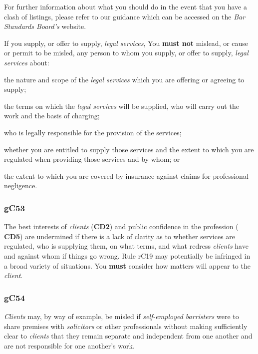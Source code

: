 For further information about what you should do in the event that you
have a clash of listings, please refer to our guidance which can be
accessed on the \emph{Bar Standards Board's} website.




If you supply, or offer to supply, \emph{legal services}, You \textcolor{myred}{\textbf{must not}}
mislead, or cause or permit to be misled, any person to whom you supply,
or offer to supply, \emph{legal services} about:
\begin{numlist}\item the nature and scope of the \emph{legal services} which you are
offering or agreeing to supply;
\item the terms on which the \emph{legal services} will be supplied, who
will carry out the work and the basis of charging;
\item who is legally responsible for the provision of the services;
\item whether you are entitled to supply those services and the extent to
which you are regulated when providing those services and by whom; or
\item the extent to which you are covered by insurance against claims for
professional negligence.
\end{numlist}


\subsubsection{\color{darkgrey}gC53}

The best interests of \emph{clients} (\textcolor{mygold}{\textbf{CD2}}) and public confidence in the
profession ( \textbf{\textcolor{mygold}{CD5}}) are undermined if there is a lack of clarity as to
whether services are regulated, who is supplying them, on what terms,
and what redress \emph{clients} have and against whom if things go
wrong. Rule rC19 may potentially be infringed in a broad variety of
situations. You \textcolor{myred}{\textbf{must}} consider how matters will appear to the
\emph{client}.

\subsubsection{\color{darkgrey}gC54}

\emph{Clients} may, by way of example, be misled if \emph{self-employed
barristers} were to share premises with \emph{solicitors} or other
professionals without making sufficiently clear to \emph{clients} that
they remain separate and independent from one another and are not
responsible for one another's work.

